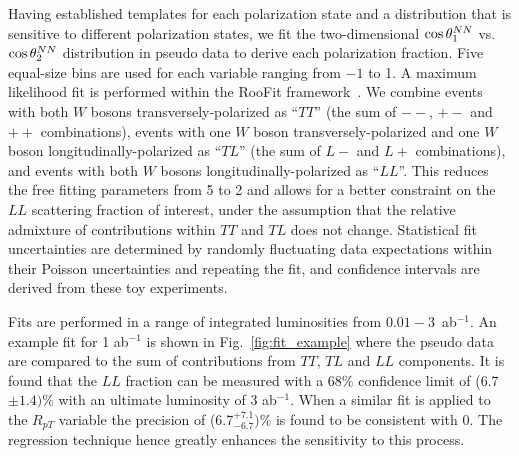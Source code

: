 Having established templates for each polarization state and a
distribution that is sensitive to different polarization states, 
we fit the two-dimensional $ \cos \theta^{NN}  _1$ vs. $ \cos \theta^{NN}  _2$
distribution in pseudo data to derive each polarization fraction. Five equal-size bins 
are used for each \ctsNN variable ranging from $-1$ to 1. A maximum likelihood fit is performed 
within the RooFit framework~\cite{RooFit}. We combine events with both $W$ bosons transversely-polarized as
``$TT$'' (the sum of $--$, $+-$ and $++$ combinations), events with
one $W$ boson transversely-polarized and one $W$ boson
longitudinally-polarized as ``$TL$'' (the sum of $L-$ and $L+$
combinations), and events with both $W$ bosons
longitudinally-polarized as ``$LL$''. This reduces the free fitting parameters from 5 to 2 and 
allows for a better constraint on the $LL$ scattering fraction of interest, under the assumption that
the relative admixture of contributions within $TT$ and $TL$ does not change. Statistical fit uncertainties are determined by randomly
fluctuating data expectations within their Poisson uncertainties and
repeating the fit, and confidence intervals are derived from these toy experiments.  


Fits are performed in a range of integrated luminosities from $0.01-3$~ab$^{-1}$. An example fit for 1 ab$^{-1}$ is shown in Fig.~\ref{fig:fit_example} where the pseudo data are compared to the sum of 
contributions from $TT$, $TL$ and $LL$ components. It is found that the $LL$ fraction can be measured with a 68\% confidence limit of (6.7$\pm 1.4)\%$ with an ultimate luminosity of 3 ab$^{-1}$. When a similar fit is applied to the $R_{pT}$ variable the precision of (6.7$^{+7.1}_{- 6.7})\%$ is found to be consistent with 0. The regression technique hence greatly enhances the sensitivity to this process.

